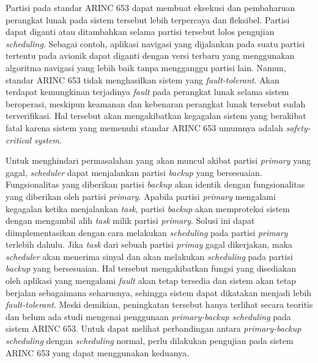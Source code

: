 Partisi pada standar ARINC 653 dapat membuat eksekusi dan pembaharuan perangkat lunak pada sistem tersebut lebih terpercaya dan fleksibel.
Partisi dapat diganti atau ditambahkan selama partisi tersebut lolos pengujian \textit{scheduling}.
Sebagai contoh, aplikasi navigasi yang dijalankan pada suatu partisi tertentu pada avionik dapat diganti dengan versi terbaru yang menggunakan algoritma navigasi yang lebih baik tanpa mengganggu partisi lain.
Namun, standar ARINC 653 tidak menghasilkan sistem yang \textit{fault-tolerant}.
Akan terdapat kemungkinan terjadinya \textit{fault} pada perangkat lunak selama sistem beroperasi, meskipun keamanan dan kebenaran perangkat lunak tersebut sudah terverifikasi.
Hal tersebut akan mengakibatkan kegagalan sistem yang berakibat fatal karena sistem yang memenuhi standar ARINC 653 umumnya adalah \textit{safety-critical system}.

Untuk menghindari permasalahan yang akan muncul akibat partisi \textit{primary} yang gagal, \textit{scheduler} dapat menjalankan partisi \textit{backup} yang bersesuaian.
Fungsionalitas yang diberikan partisi \textit{backup} akan identik dengan fungsionalitas yang diberikan oleh partisi \textit{primary}.
Apabila partisi \textit{primary} mengalami kegagalan ketika menjalankan \textit{task}, partisi \textit{backup} akan memproteksi sistem dengan mengambil alih \textit{task} milik partisi \textit{primary}.
Solusi ini dapat diimplementasikan dengan cara melakukan \textit{scheduling} pada partisi \textit{primary} terlebih dahulu.
Jika \textit{task} dari sebuah partisi \textit{primay} gagal dikerjakan, maka \textit{scheduler} akan menerima sinyal dan akan melakukan \textit{scheduling} pada partisi \textit{backup} yang bersesuaian.
Hal tersebut mengakibatkan fungsi yang disediakan oleh aplikasi yang mengalami \textit{fault} akan tetap tersedia dan sistem akan tetap berjalan sebagaimana seharusnya, sehingga sistem dapat dikatakan menjadi lebih \textit{fault-tolerant}.
Meski demikian, peningkatan tersebut hanya terlihat secara teoritis dan belum ada studi mengenai penggunaan \textit{primary-backup scheduling} pada sistem ARINC 653.
Untuk dapat melihat perbandingan antara \textit{primary-backup scheduling} dengan \textit{scheduling} normal, perlu dilakukan pengujian pada sistem ARINC 653 yang dapat menggunakan keduanya.

